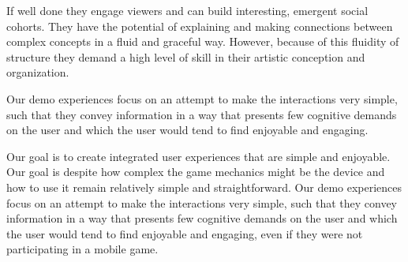 \documentclass{chi-ext}
\begin{document}
If well done they engage viewers and can build interesting, emergent social cohorts. They have the potential of explaining and making connections between complex concepts in a fluid and graceful way. However, because of this fluidity of structure they demand a high level of skill in their artistic conception and organization. 



Our demo experiences focus on an attempt to make the interactions very simple, such that they convey information in a way that presents few cognitive demands on the user and which the user would tend to find enjoyable and engaging.

Our goal is to create integrated user experiences that are simple and enjoyable. Our goal is despite how complex the game mechanics might be the device and how to use it remain relatively simple and straightforward.  Our demo experiences focus on an attempt to make the interactions very simple, such that they convey information in a way that presents few cognitive demands on the user and which the user would tend to find enjoyable and engaging, even if they were not participating in a mobile game. 
\end{document}
